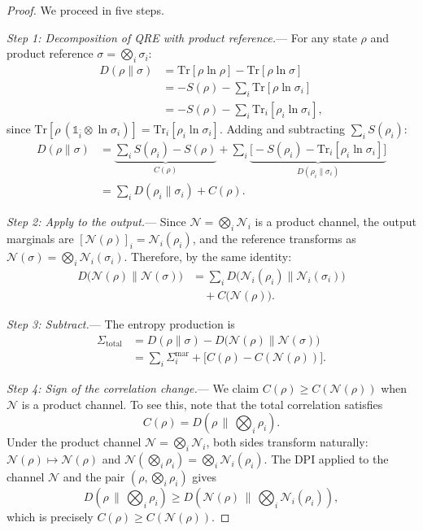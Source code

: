 \documentclass[letterpaper,twocolumn,superscriptaddress,longbibliography]{revtex4-2}
\newcommand{\Tr}{\mathrm{Tr}}
\newcommand{\chan}{\mathcal{N}}
\begin{document}
\begin{proof}
We proceed in five steps.

\emph{Step 1: Decomposition of QRE with product reference.}---
For any state $\rho$ and product reference
$\sigma = \bigotimes_i \sigma_i$:
\begin{align}
  D(\rho \| \sigma)
  &= \Tr[\rho \ln\rho] - \Tr[\rho \ln\sigma]
  \nonumber \\
  &= -S(\rho) - \sum_i \Tr[\rho \ln\sigma_i]
  \nonumber \\
  &= -S(\rho) - \sum_i \Tr_i[\rho_i \ln\sigma_i],
  \label{eq:step1a}
\end{align}
since $\Tr[\rho \, (\mathbb{1}_{\bar{i}} \otimes \ln\sigma_i)]
= \Tr_i[\rho_i \ln\sigma_i]$.
Adding and subtracting $\sum_i S(\rho_i)$:
\begin{align}
  D(\rho \| \sigma)
  &= \underbrace{\sum_i S(\rho_i) - S(\rho)}_{C(\rho)}
     + \sum_i \underbrace{\bigl[-S(\rho_i) -
     \Tr_i[\rho_i \ln\sigma_i]\bigr]}_{D(\rho_i\|\sigma_i)}
  \nonumber \\
  &= \sum_i D(\rho_i \| \sigma_i) + C(\rho).
  \label{eq:QRE_decomp}
\end{align}

\emph{Step 2: Apply to the output.}---
Since $\chan = \bigotimes_i \chan_i$ is a product channel, the output
marginals are $[\chan(\rho)]_i = \chan_i(\rho_i)$, and the reference
transforms as
$\chan(\sigma) = \bigotimes_i \chan_i(\sigma_i)$.
Therefore, by the same identity:
\begin{align}
  D\bigl(\chan(\rho) \| \chan(\sigma)\bigr)
  &= \sum_i D\bigl(\chan_i(\rho_i) \| \chan_i(\sigma_i)\bigr)
  \nonumber \\
  &\quad + C\bigl(\chan(\rho)\bigr).
  \label{eq:QRE_output_decomp}
\end{align}

\emph{Step 3: Subtract.}---
The entropy production is
\begin{align}
  \Sigma_{\mathrm{total}}
  &= D(\rho\|\sigma) - D\bigl(\chan(\rho)\|\chan(\sigma)\bigr)
  \nonumber \\
  &= \sum_i \Sigma_i^{\mathrm{mar}}
     + \bigl[C(\rho) - C(\chan(\rho))\bigr].
  \label{eq:Sigma_decomp_proof}
\end{align}

\emph{Step 4: Sign of the correlation change.}---
We claim $C(\rho) \geq C(\chan(\rho))$ when $\chan$ is a product
channel.  To see this, note that the total correlation satisfies
\begin{equation}
  C(\rho)
  = D\!\left(\rho \,\bigg\|\, \bigotimes_i \rho_i\right).
  \label{eq:C_as_QRE}
\end{equation}
Under the product channel $\chan = \bigotimes_i \chan_i$, both
sides transform naturally:
$\chan(\rho) \mapsto \chan(\rho)$ and
$\chan(\bigotimes_i \rho_i) = \bigotimes_i \chan_i(\rho_i)$.
The DPI applied to the channel $\chan$ and the pair
$(\rho, \bigotimes_i \rho_i)$ gives
\begin{equation}
  D\!\left(\rho \,\bigg\|\, \bigotimes_i \rho_i\right)
  \geq
  D\!\left(\chan(\rho) \,\bigg\|\, \bigotimes_i \chan_i(\rho_i)\right),
  \label{eq:DPI_correlation}
\end{equation}
which is precisely $C(\rho) \geq C(\chan(\rho))$.


\end{proof}
\end{document}
